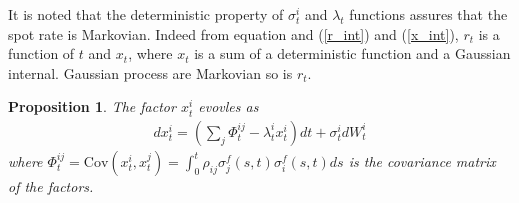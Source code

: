 \documentclass[10pt]{article}
\theoremstyle{plain}
\newtheorem{prop}{Proposition}[section]
\numberwithin{equation}{section}
\numberwithin{table}{section}
\begin{document}
It is noted that the deterministic property of $\sigma_{t}^i$ and $
\lambda_{t}$ functions assures that the spot rate is Markovian. Indeed from
equation and (\ref{r_int}) and (\ref{x_int}), $r_{t}$ is a function of $t$
and $x_{t}$, where $x_{t}$ is a sum of a deterministic function and a
Gaussian internal. Gaussian process are Markovian so is $r_{t}$.


\begin{prop}
    The factor $x_{t}^i$ evovles as 
    \begin{eqnarray}
        dx^i_{t} = \left(\sum_{j}\Phi_{t}^{ij}-\lambda_{t}^ix_{t}^i \right)dt+
        \sigma_{t}^i dW_{t}^{i}  \label{x_SDE}
    \end{eqnarray}
    where $\Phi^{ij}_{t}= \mathrm{Cov}(x_{t}^i, x_{t}^j) =
    \int_{0}^t\rho_{ij}\sigma^f_{j}(s,t)\sigma_{i}^f(s,t)ds$ is the covariance
    matrix of the factors.
\end{prop}
\end{document}
